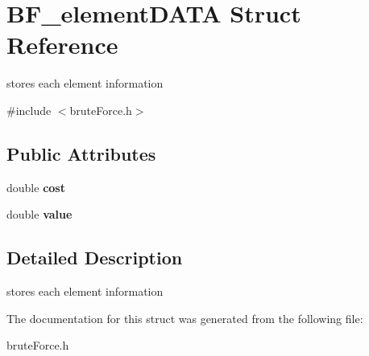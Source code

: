 \hypertarget{struct_b_f__element_d_a_t_a}{}\section{B\+F\+\_\+element\+D\+A\+T\+A Struct Reference}
\label{struct_b_f__element_d_a_t_a}


stores each element information  




{\ttfamily \#include $<$brute\+Force.\+h$>$}

\subsection*{Public Attributes}
\begin{DoxyCompactItemize}
\item 
\hypertarget{struct_b_f__element_d_a_t_a_ae232c7505bda3893516bf5c06d30757b}{}double {\bfseries cost}\label{struct_b_f__element_d_a_t_a_ae232c7505bda3893516bf5c06d30757b}

\item 
\hypertarget{struct_b_f__element_d_a_t_a_af4765c7ca62b5e581c2523f38c18257e}{}double {\bfseries value}\label{struct_b_f__element_d_a_t_a_af4765c7ca62b5e581c2523f38c18257e}

\end{DoxyCompactItemize}


\subsection{Detailed Description}
stores each element information 

The documentation for this struct was generated from the following file\+:\begin{DoxyCompactItemize}
\item 
brute\+Force.\+h\end{DoxyCompactItemize}
